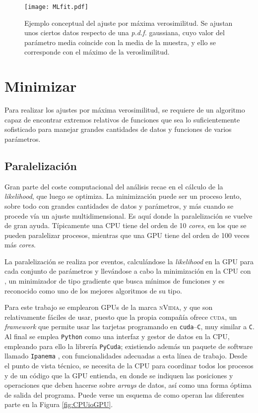 \begin{figure}[H]
\centering
\texttt{[image: MLfit.pdf]}
\caption{Ejemplo conceptual del ajuste por máxima verosimilitud. Se ajustan unos ciertos datos respecto de una \textit{p.d.f.} gaussiana, cuyo valor del parámetro media coincide con la media de la muestra, y ello se corresponde con el máximo de la veroslimilitud.} \label{fig_maxloglikeexp}
\end{figure}	






\section{Minimizar}

Para realizar los ajustes por máxima verosimilitud, se requiere de un algoritmo capaz de encontrar extremos relativos de funciones que sea lo suficientemente sofisticado para manejar grandes cantidades de datos y funciones de varios parámetros. 


\subsection{Paralelización}



\color{dieg}
Gran parte del coste computacional  del análisis recae en el cálculo de la \emph{likelihood}, que luego se optimiza.  
%
La minimización puede ser un proceso lento, sobre todo con grandes cantidades de datos y parámetros, y más cuando se procede vía un ajuste multidimensional. Es aquí donde la paralelización se vuelve de gran ayuda. Típicamente una CPU tiene del orden de 10 \textit{cores}, en los que se pueden paralelizar procesos, mientras que una GPU tiene del orden de 100 veces más \textit{cores}. 

La paralelización se realiza por eventos, calculándose la \emph{likelihood} en la GPU para cada conjunto de parámetros y llevándose a cabo la minimización en la CPU con \minuit \cite{James:1975dr},  un minimizador de tipo gradiente que busca mínimos de funciones y es reconocido como uno de los mejores algoritmos de su tipo. 
\color{norm}

Para este trabajo se emplearon GPUs de la marca \textsc{nVidia}, y que son relativamente fáciles de usar, puesto que la propia compañía ofrece \textsc{cuda}, un \textit{framework} que permite usar las tarjetas programando en \texttt{cuda}--\texttt{C}, muy similar a \texttt{C}.
%
Al final se emplea \texttt{Python} como una interfaz y gestor de datos en la CPU, empleando para ello la librería \texttt{PyCuda}; existiendo además un paquete de software llamado \texttt{Ipanema} \cite{santos2017ipanema}, con funcionalidades adecuadas a esta línea de trabajo. Desde el punto de vista técnico, se necesita de la CPU para coordinar todos los procesos y de un código que la GPU entienda, en donde se indiquen las posiciones y operaciones que deben hacerse sobre \emph{arrays} de datos, así como una forma óptima de salida del programa. Puede verse un esquema de como operan las diferentes parte en la Figura \ref{fig:CPUioGPU}.






